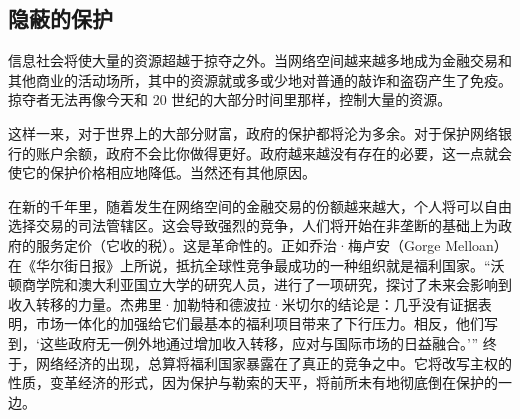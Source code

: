\subsection{隐蔽的保护}
信息社会将使大量的资源超越于掠夺之外。当网络空间越来越多地成为金融交易和其他商业的活动场所，其中的资源就或多或少地对普通的敲诈和盗窃产生了免疫。掠夺者无法再像今天和 20 世纪的大部分时间里那样，控制大量的资源。

这样一来，对于世界上的大部分财富，政府的保护都将沦为多余。对于保护网络银行的账户余额，政府不会比你做得更好。政府越来越没有存在的必要，这一点就会使它的保护价格相应地降低。当然还有其他原因。

在新的千年里，随着发生在网络空间的金融交易的份额越来越大，个人将可以自由选择交易的司法管辖区。这会导致强烈的竞争，人们将开始在非垄断的基础上为政府的服务定价（它收的税）。这是革命性的。正如乔治·梅卢安（Gorge Melloan）在《华尔街日报》上所说，抵抗全球性竞争最成功的一种组织就是福利国家。“沃顿商学院和澳大利亚国立大学的研究人员，进行了一项研究，探讨了未来会影响到收入转移的力量。杰弗里·加勒特和德波拉·米切尔的结论是：几乎没有证据表明，市场一体化的加强给它们最基本的福利项目带来了下行压力。相反，他们写到，‘这些政府无一例外地通过增加收入转移，应对与国际市场的日益融合。’” 终于，网络经济的出现，总算将福利国家暴露在了真正的竞争之中。它将改写主权的性质，变革经济的形式，因为保护与勒索的天平，将前所未有地彻底倒在保护的一边。